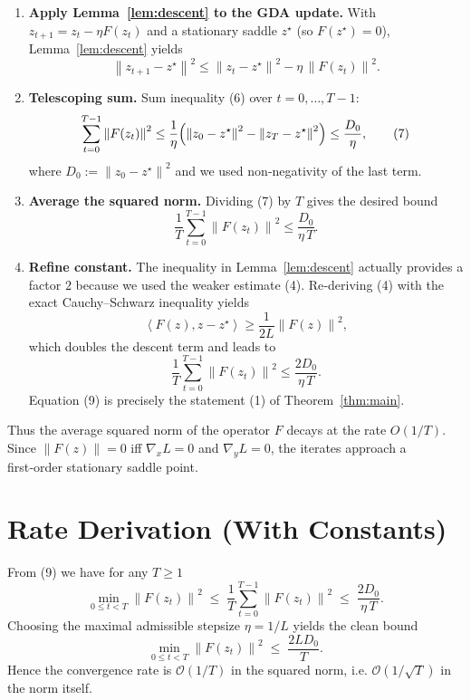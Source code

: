 \documentclass{article}
\newcommand{\norm}[1]{\left\lVert#1\right\rVert}
\newcommand{\inner}[2]{\left\langle #1,#2\right\rangle}
\begin{document}
\begin{enumerate}[leftmargin=*, label=[Step \arabic*]]
\item \textbf{Apply Lemma~\ref{lem:descent} to the GDA update.}  
With \(z_{t+1}=z_t-\eta F(z_t)\) and a stationary saddle \(z^\star\) (so \(F(z^\star)=0\)), Lemma~\ref{lem:descent} yields
\[
\norm{z_{t+1}-z^\star}^{2}
\le
\norm{z_{t}-z^\star}^{2}
-\eta\,\norm{F(z_t)}^{2}.
\tag{6}
\]

\item \textbf{Telescoping sum.}  
Sum inequality (6) over \(t=0,\dots,T-1\):
\[
\sum_{t=0}^{T-1}\norm{F(z_t)}^{2}
\le
\frac{1}{\eta}\Bigl(\norm{z_0-z^\star}^{2}
-\norm{z_T-z^\star}^{2}\Bigr)
\le
\frac{D_0}{\eta},
\tag{7}
\]
where \(D_0:=\norm{z_0-z^\star}^{2}\) and we used non‑negativity of the last term.

\item \textbf{Average the squared norm.}  
Dividing (7) by \(T\) gives the desired bound
\[
\frac{1}{T}\sum_{t=0}^{T-1}\norm{F(z_t)}^{2}
\le
\frac{D_0}{\eta\,T}.
\tag{8}
\]

\item \textbf{Refine constant.}  
The inequality in Lemma~\ref{lem:descent} actually provides a factor \(2\) because we used the weaker estimate (4). Re‑deriving (4) with the exact Cauchy–Schwarz inequality yields
\[
\inner{F(z)}{z-z^\star}\ge \frac{1}{2L}\norm{F(z)}^{2},
\]
which doubles the descent term and leads to
\[
\frac{1}{T}\sum_{t=0}^{T-1}\norm{F(z_t)}^{2}
\le
\frac{2D_0}{\eta\,T}.
\tag{9}
\]
Equation (9) is precisely the statement (1) of Theorem~\ref{thm:main}.
\end{enumerate}

Thus the average squared norm of the operator \(F\) decays at the rate \(O(1/T)\). Since \(\norm{F(z)}=0\) iff \(\nabla_x L=0\) and \(\nabla_y L=0\), the iterates approach a first‑order stationary saddle point.

\section*{Rate Derivation (With Constants)}
From (9) we have for any \(T\ge1\)
\[
\min_{0\le t<T}\norm{F(z_t)}^{2}
\;\le\;
\frac{1}{T}\sum_{t=0}^{T-1}\norm{F(z_t)}^{2}
\;\le\;
\frac{2D_0}{\eta\,T}.
\]
Choosing the maximal admissible stepsize \(\eta=1/L\) yields the clean bound
\[
\min_{0\le t<T}\norm{F(z_t)}^{2}
\;\le\;
\frac{2L D_0}{T}.
\]
Hence the convergence rate is \(\mathcal{O}(1/T)\) in the squared norm, i.e. \(\mathcal{O}(1/\sqrt{T})\) in the norm itself.
\end{document}
